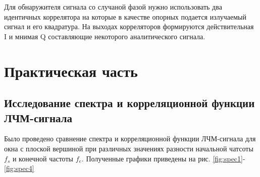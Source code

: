 Для обнаружителя сигнала со случаной фазой нужно использовать два идентичных коррелятора
на которые в качестве опорных подается излучаемый сигнал и его квадратура. На выходах
корреляторов формируются действительная I и мнимая Q составляющие некоторого
аналитического сигнала.

\section{Практическая часть}


\subsection{Исследование спектра и корреляционной функции ЛЧМ-сигнала}
Было проведено сравнение спектра и корреляционной функции ЛЧМ-сигнала для окна с
плоской вершиной при различных значениях разности начальной чатсоты $f_{s}$ и
конечной частоты $f_{e}$. Полученные графики приведены на рис. \ref{fig:spec1}-\ref{fig:spec4}

